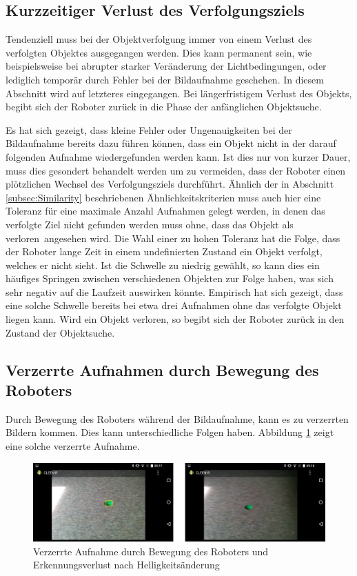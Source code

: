 \subsection{Kurzzeitiger Verlust des Verfolgungsziels}

Tendenziell muss bei der Objektverfolgung immer von einem Verlust des verfolgten Objektes ausgegangen werden. Dies kann permanent sein, wie beispielsweise bei abrupter starker Veränderung der Lichtbedingungen, oder lediglich temporär durch Fehler bei der Bildaufnahme geschehen. In diesem Abschnitt wird auf letzteres eingegangen. Bei längerfristigem Verlust des Objekts, begibt sich der Roboter zurück in die Phase der anfänglichen Objektsuche.

Es hat sich gezeigt, dass kleine Fehler oder Ungenauigkeiten bei der Bildaufnahme bereits dazu führen können, dass ein Objekt nicht in der darauf folgenden Aufnahme wiedergefunden werden kann. Ist dies nur von kurzer Dauer, muss dies gesondert behandelt werden um zu vermeiden, dass der Roboter einen plötzlichen Wechsel des Verfolgungsziels durchführt. Ähnlich der in Abschnitt \ref{subsec:Similarity} beschriebenen Ähnlichkeitskriterien muss auch hier eine Toleranz für eine maximale Anzahl Aufnahmen gelegt werden, in denen das verfolgte Ziel nicht gefunden werden muss ohne, dass das Objekt als \glqq verloren\grqq\ angesehen wird. Die Wahl einer zu hohen Toleranz hat die Folge, dass der Roboter lange Zeit in einem undefinierten Zustand ein Objekt verfolgt, welches er nicht sieht. Ist die Schwelle zu niedrig gewählt, so kann dies ein häufiges Springen zwischen verschiedenen Objekten zur Folge haben, was sich sehr negativ auf die Laufzeit auswirken könnte. Empirisch hat sich gezeigt, dass eine solche Schwelle bereits bei etwa drei Aufnahmen ohne das verfolgte Objekt liegen kann. Wird ein Objekt verloren, so begibt sich der Roboter zurück in den Zustand der Objektsuche.


\subsection{Verzerrte Aufnahmen durch Bewegung des Roboters}

Durch Bewegung des Roboters während der Bildaufnahme, kann es zu verzerrten Bildern kommen. Dies kann unterschiedliche Folgen haben. Abbildung \ref{fig:Verzerrung} zeigt eine solche verzerrte Aufnahme. 

\begin{figure}[h]
\centering
\includegraphics[width=\textwidth]{Bilder/Workloop/ObjectLossOnMovement}
\caption{Verzerrte Aufnahme durch Bewegung des Roboters und Erkennungsverlust nach Helligkeitsänderung}
\label{fig:Verzerrung}
\end{figure}

